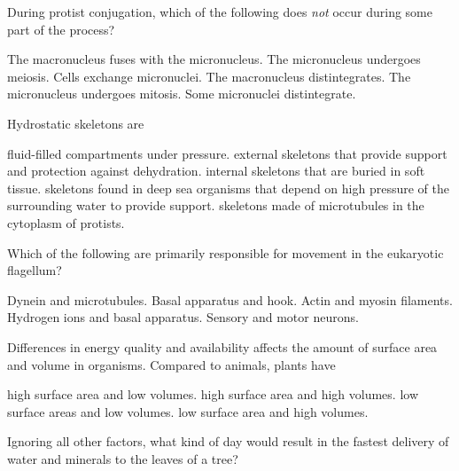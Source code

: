 \question
During protist conjugation, which of the following does \emph{not} occur during some part of the process?

\begin{choices}
\correctchoice The macronucleus fuses with the micronucleus. %
\choice The micronucleus undergoes meiosis. %
\choice Cells exchange micronuclei.  %
\choice The macronucleus distintegrates. %
\choice The micronucleus undergoes mitosis. %
\choice Some micronuclei distintegrate. %
\end{choices}


\question
Hydrostatic skeletons are 

\begin{choices}
\correctchoice fluid-filled compartments under pressure. %
\choice external skeletons that provide support and protection against dehydration. %
\choice internal skeletons that are buried in soft tissue.  %
\choice skeletons found in deep sea organisms that depend on high pressure of the surrounding water to provide support. %
\choice skeletons made of microtubules in the cytoplasm of protists. %
\end{choices}

\question
Which of the following are primarily responsible for movement in the eukaryotic flagellum?

\begin{choices}
\correctchoice Dynein and microtubules. %
\choice Basal apparatus and hook. %
\choice Actin and myosin filaments.  %
\choice Hydrogen ions and basal apparatus. %
\choice Sensory and motor neurons. %
\end{choices}

\question
Differences in energy quality and availability affects the amount of surface area and volume in organisms. Compared to animals, plants have 

\begin{choices}
\correctchoice high surface area and low volumes. %
\choice high surface area and high volumes. %
\choice low surface areas and low volumes.  %
\choice low surface area and high volumes. %
\end{choices}

\question
Ignoring all other factors, what kind of day would result in the fastest delivery of water and minerals to the leaves of a tree?

